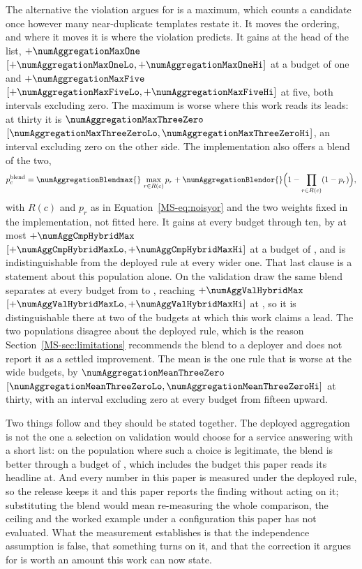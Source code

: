 \documentclass[journal=jcisd8,manuscript=suppinfo,layout=onecolumn]{achemso}
\begin{document}
The alternative the violation argues for is a maximum, which counts a candidate once however many
near-duplicate templates restate it. It moves the ordering, and where it moves it is where the
violation predicts. It gains at the head of the list, $+\numAggregationMaxOne$
$[+\numAggregationMaxOneLo, +\numAggregationMaxOneHi]$ at a budget of one and
$+\numAggregationMaxFive$ $[+\numAggregationMaxFiveLo, +\numAggregationMaxFiveHi]$ at five,
both intervals excluding zero. The maximum is worse where this work reads its leads: at thirty
it is $\numAggregationMaxThreeZero$ $[\numAggregationMaxThreeZeroLo,
\numAggregationMaxThreeZeroHi]$, an interval excluding zero on the other side. The implementation
also offers a blend of the two,
\begin{equation}
  p_c^{\mathrm{blend}} = \numAggregationBlendmax{}\,\max_{r \in R(c)} p_r
  + \numAggregationBlendor{}\Bigl(1 - \prod_{r \in R(c)}(1 - p_r)\Bigr),
  \label{eq:blend}
\end{equation}
with $R(c)$ and $p_r$ as in Equation~\ref{MS-eq:noisyor} and the two weights fixed in the
implementation, not fitted here. It gains at every budget through ten, by at most
$+\numAggCmpHybridMax$ $[+\numAggCmpHybridMaxLo, +\numAggCmpHybridMaxHi]$ at a budget of
\numAggCmpHybridMaxkWord{}, and is indistinguishable from the deployed rule at every wider one.
That last clause is a statement about this population alone. On the validation
draw the same blend separates at every budget from \numAggValHybridSepfromWord{} to
\numAggValHybridSepto{}, reaching $+\numAggValHybridMax$ $[+\numAggValHybridMaxLo,
+\numAggValHybridMaxHi]$ at \numAggValHybridMaxkWord{}, so it is distinguishable there at two of
the budgets at which this work claims a lead. The two populations disagree about the deployed rule,
which is the reason Section~\ref{MS-sec:limitations} recommends the blend to a deployer and does
not report it as a settled improvement. The mean is the one rule that is worse at the wide budgets,
by $\numAggregationMeanThreeZero$ $[\numAggregationMeanThreeZeroLo,
\numAggregationMeanThreeZeroHi]$ at thirty, with an interval excluding zero at every budget from
fifteen upward.

Two things follow and they should be stated together. The deployed aggregation is not the one a
selection on validation would choose for a service answering with a short list: on the population
where such a choice is legitimate, the blend is better through a budget of
\numAggvalHybridwinsmax{}, which includes the budget this paper reads its headline at. And every
number in this paper is measured under the deployed rule, so the release keeps it and this paper
reports the finding without acting on it; substituting the blend would mean re-measuring the whole
comparison, the ceiling and the worked example under a configuration this paper has not evaluated.
What the measurement establishes is that the independence assumption is false, that something
turns on it, and that the correction it argues for is worth an amount this work can now state.
\end{document}
